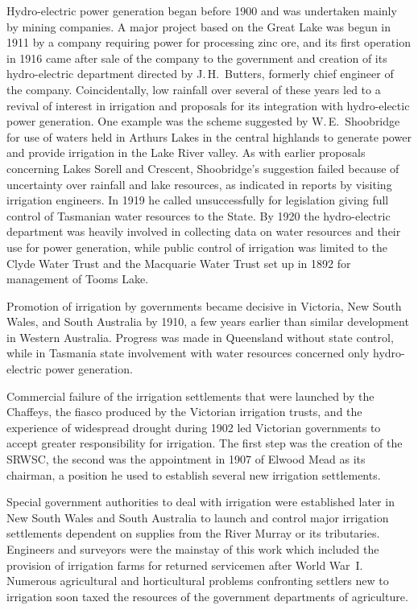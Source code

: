 Hydro-electric power generation began before 1900 and was undertaken
mainly by mining companies.  A major project based on the Great Lake
 was begun in 1911 by a company requiring power for
processing zinc ore, and its first operation in 1916 came after sale
of the company to the government and creation of its hydro-electric
department directed by J.\,H.~Butters,  formerly
chief engineer of the company.  Coincidentally, low rainfall over
several of these years led to a revival of interest in irrigation and
proposals for its integration with hydro-electic power generation.
One example was the scheme suggested by W.\,E.~Shoobridge
 for use of
waters held in Arthurs Lakes  in the central
highlands to generate power and provide irrigation in the Lake River
 valley.  As with earlier proposals concerning Lakes
Sorell and Crescent, Shoobridge's suggestion failed because of
uncertainty over rainfall and lake resources, as indicated in reports
by visiting irrigation engineers. In 1919 he called unsuccessfully for
legislation giving full control of Tasmanian water resources to the
State.  By 1920 the hydro-electric department was heavily involved in
collecting data on water resources and their use for power generation,
while public control of irrigation was limited to the Clyde Water
Trust and the Macquarie Water Trust  set
up in 1892 for management of  Tooms
Lake.


\closure
Promotion of irrigation by governments became decisive in Victoria,
New South Wales, and South Australia by 1910, a few years earlier than
similar development in Western Australia.  Progress was made in
Queensland without state control, while in Tasmania state involvement
with water resources concerned only hydro-electric power generation.

Commercial failure of the irrigation settlements that were launched by
the Chaffeys, the fiasco produced by the Victorian irrigation trusts,
and the experience of widespread drought during 1902 led Victorian
governments to accept greater responsibility for irrigation.  The
first step was the creation of the SRWSC, the second was the
appointment in 1907 of Elwood Mead as its chairman, a position he used
to establish several new irrigation settlements.

Special government authorities to deal with irrigation were
established later in New South Wales and South Australia to launch and
control major irrigation settlements dependent on supplies from the
River Murray or its tributaries.  Engineers and surveyors were the
mainstay of this work which included the provision of irrigation farms
for returned servicemen after World War~I.  Numerous agricultural and
horticultural problems confronting settlers new to irrigation soon
taxed the resources of the government departments of agriculture.

